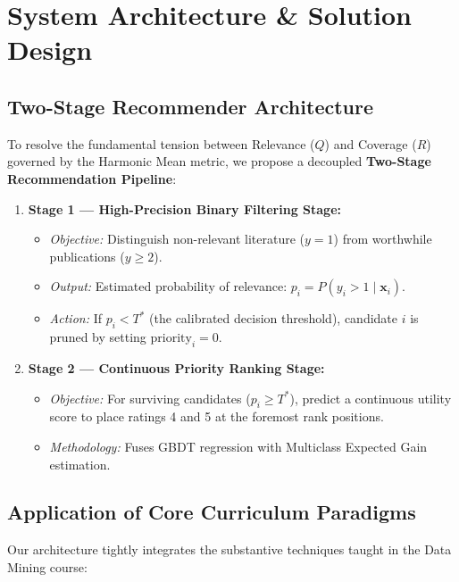 \chapter{System Architecture \& Solution Design}
\label{chap:solution}

\section{Two-Stage Recommender Architecture}
To resolve the fundamental tension between Relevance ($Q$) and Coverage ($R$) governed by the Harmonic Mean metric, we propose a decoupled \textbf{Two-Stage Recommendation Pipeline}:

\begin{prismbox}[title=\textbf{Operational Workflow of the Two-Stage Architecture}]
\begin{enumerate}
  \item \textbf{Stage 1 --- High-Precision Binary Filtering Stage:}
    \begin{itemize}
      \item \textit{Objective:} Distinguish non-relevant literature ($y = 1$) from worthwhile publications ($y \ge 2$).
      \item \textit{Output:} Estimated probability of relevance: $p_i = P(y_i > 1 \mid \bm{x}_i)$.
      \item \textit{Action:} If $p_i < T^*$ (the calibrated decision threshold), candidate $i$ is pruned by setting $\text{priority}_i = 0$.
    \end{itemize}
  \item \textbf{Stage 2 --- Continuous Priority Ranking Stage:}
    \begin{itemize}
      \item \textit{Objective:} For surviving candidates ($p_i \ge T^*$), predict a continuous utility score to place ratings 4 and 5 at the foremost rank positions.
      \item \textit{Methodology:} Fuses GBDT regression with Multiclass Expected Gain estimation.
    \end{itemize}
\end{enumerate}
\end{prismbox}

\section{Application of Core Curriculum Paradigms}
Our architecture tightly integrates the substantive techniques taught in the Data Mining course:


